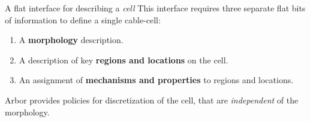 \documentclass[aspectratio=43]{beamer}
\newcommand{\arbor}{{\ttfamily Arbor}\xspace}
\begin{document}
\begin{frame}[fragile]{A flat interface for describing a \emph{cell}}
    This interface requires three separate flat bits of information to define a single cable-cell:

    \vspace{10pt}

    \begin{enumerate}
        \item A \textbf{morphology} description.
        \item A description of key \textbf{regions and locations} on the cell.
        \item An assignment of \textbf{mechanisms and properties} to regions and locations.
    \end{enumerate}

    \vspace{10pt}

    \arbor provides policies for discretization of the cell, that are \textit{independent} of the morphology.
\end{frame}
\end{document}
